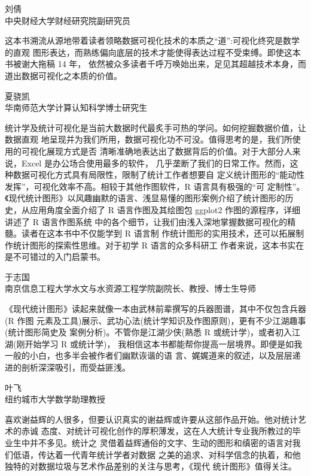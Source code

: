 \documentclass[
  b5paper,
  UTF8,twoside]{book}
\begin{document}
\begin{flushright}
刘倩\\
中央财经大学财经研究院副研究员
\end{flushright}

这本书溯流从源地带着读者领略数据可视化技术的本质之``道'':可视化终究是数学的直观 图形表达，而熟练偏向底层的技术才能使得表达过程不受束缚。即使这本书被谢大拖稿 14 年， 依然被众多读者千呼万唤始出来，足见其超越技术本身，而道出数据可视化之本质的价值。

\begin{flushright}
夏骁凯\\
华南师范大学计算认知科学博士研究生
\end{flushright}

统计学及统计可视化是当前大数据时代最炙手可热的学问。如何挖掘数据价值，让数据直观 地呈现并为我们所用，数据可视化功不可没。值得思考的是，我们所使用的可视化展现方式是否 清晰准确地表达出了数据背后的价值。对于大部分人来说，Excel 是办公场合使用最多的软件， 几乎垄断了我们的日常工作。然而，这种数据可视化方式具有局限性，限制了统计工作者想要自 定义统计图形的``能动性发挥''，可视化效率不高。相较于其他作图软件，R 语言具有极强的``可 定制性''。《现代统计图形》以风趣幽默的语言、浅显易懂的图形案例介绍了统计图形的历史，从应用角度全面介绍了 R 语言作图及其绘图包 ggplot2 作图的源程序，详细讲述了 R 语言作图系统 中的各个细节，让我们由浅入深地掌握数据可视化的精髓。读者在这本书中不仅能学到 R 语言制 作统计图形的实用技术，还可以拓展制作统计图形的探索性思维。对于初学 R 语言的众多科研工 作者来说，这本书实在是不可错过的入门启蒙书。

\begin{flushright}
于志国\\
南京信息工程大学水文与水资源工程学院副院长、教授、博士生导师
\end{flushright}

《现代统计图形》读起来就像一本由武林前辈撰写的兵器图谱，其中不仅包含兵器(R 作图 元素及工具)展示、武功心法(统计学知识及作图原则)，更有不少江湖趣事(统计图形简史及 案例分析)。不管你是江湖少侠(熟悉 R 或统计学)，或者初入江湖(刚开始学习 R 或统计学)， 我相信这本书都能帮你提高一层境界。即便是如我一般的小白，也多半会被作者们幽默诙谐的语 言、娓娓道来的叙述，以及层层递进的剖析深深吸引，而受益匪浅。

\begin{flushright}
叶飞\\
纽约城市大学数学助理教授
\end{flushright}

喜欢谢益辉的人很多，但要认识真实的谢益辉或许要从这部作品开始。他对统计艺术的赤诚 态度、对统计可视化创作的厚积薄发，这在人大统计专业我所教过的毕业生中并不多见。统计之 灵借着益辉通俗的文字、生动的图形和缜密的语言对我们低语，传达着一代青年统计学者对数据 之美的追求、对科学信念的执着，和他独特的对数据垃圾与艺术作品差别的关注与思考，《现代 统计图形》值得关注。
\end{document}
